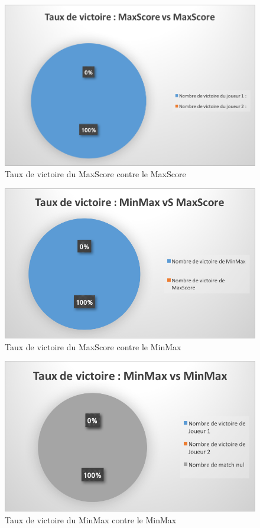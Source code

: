 \documentclass{report}
\begin{document}
    \begin{figure}[!h]
    	    \caption{Taux de victoire du MaxScore contre le MaxScore}
    	    \label{TVMaxScoreVMaxScore}
    	     \includegraphics[scale=0.60]{TauxDeVictoireMaxScoreVSMaxScore.png}
    \end{figure}
    \begin{figure}[!h]
    	    \caption{Taux de victoire du MaxScore contre le MinMax}
    	    \label{TVMaxScoreVMaxScore}
    	     \includegraphics[scale=0.60]{TauxDeVictoireMaxScoreVSMinMax.png}
    \end{figure}
    \begin{figure}[!h]
    	    \caption{Taux de victoire du MinMax contre le MinMax}
    	    \label{TVMaxScoreVMaxScore}
    	     \includegraphics[scale=0.60]{TauxDeVictoireMinMaxVSMinMax}
    \end{figure}
	
\end{document}
